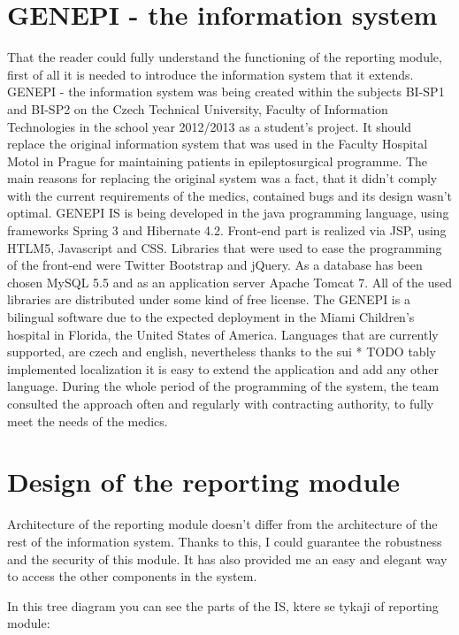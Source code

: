 \documentclass[thesis=B,english]{FITthesis}[2012/10/20]
\begin{document}
\section{GENEPI - the information system}
That the reader could fully understand the functioning of the reporting module, first of all it is needed to introduce the information system that it extends. GENEPI - the information system was being created within the subjects BI-SP1 and BI-SP2 on the Czech Technical University, Faculty of Information Technologies in the school year 2012/2013 as a student's project. It should replace the original information system that was used in the Faculty Hospital Motol in Prague for maintaining patients in epileptosurgical programme. The main reasons for replacing the original system was a fact, that it didn't comply with the current requirements of the medics, contained bugs and its design wasn't optimal. GENEPI IS is being developed in the java programming language, using frameworks Spring 3 and Hibernate 4.2. Front-end part is realized via JSP, using HTLM5, Javascript and CSS. Libraries that were used to ease the programming of the front-end were Twitter Bootstrap and jQuery. As a database has been chosen MySQL 5.5 and as an application server Apache Tomcat 7. All of the used libraries are distributed under some kind of free license. The GENEPI is a bilingual software due to the expected deployment in the Miami Children's hospital in Florida, the United States of America. Languages that are currently supported, are czech and english, nevertheless thanks to the sui         * TODO
tably implemented localization it is easy to extend the application and add any other language. During the whole period of the programming of the system, the team consulted the approach often  and regularly with contracting authority, to fully meet the needs of the medics.

\section{Design of the reporting module}
Architecture of the reporting module doesn't differ from the architecture of the rest of the information system. Thanks to this, I could guarantee the robustness and the security of this module. It has also provided me an easy and elegant way to access the other components in the system.



In this tree diagram you can see the parts of the IS, ktere se tykaji of reporting module:
\end{document}
